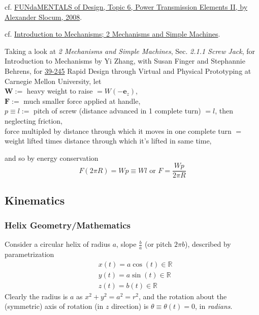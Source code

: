\documentclass[10pt]{amsart}
\begin{document}
\begin{multicols*}{2}
cf. \href{http://web.mit.edu/2.75/fundamentals/FUNdaMENTALs\%20Book\%20pdf/FUNdaMENTALs\%20Topic\%206.PDF}{FUNdaMENTALS of Design, Topic 6, Power Transmission Elements II, by Alexander Slocum, 2008}.  


cf. \href{https://www.cs.cmu.edu/~rapidproto/mechanisms/chpt2.html}{Introduction to Mechanisms; 2 Mechanisms and Simple Machines}.  

Taking a look at \emph{2 Mechanisms and Simple Machines}, Sec. \emph{2.1.1 Screw Jack}, for Introduction to Mechanisms by Yi Zhang, with Susan Finger and Stephannie Behrens, for \href{https://www.cs.cmu.edu/~rapidproto/home.html}{39-245} Rapid Design through Virtual and Physical Prototyping at Carnegie Mellon University, let \\
$\mathbf{W} :=$ heavy weight to raise $= W(-\mathbf{e}_z)$, \\
$\mathbf{F}:=$ much smaller force applied at handle, \\
$p \equiv l :=$ pitch of screw (distance advanced in 1 complete turn) $=l$, then \\
neglecting friction, \\
force multipled by distance through which it moves in one complete turn $=$ weight lifted times distance through which it's lifted in same time, 

and so by energy conservation
\[
F(2\pi R) = Wp \equiv Wl \text{ or } F = \frac{Wp }{2\pi R}
\]

\subsection{Kinematics}

\subsubsection{Helix Geometry/Mathematics}

Consider a circular helix of radius $a$, slope $\frac{b}{a}$ (or pitch $2\pi b$), described by parametrization 
\[
\begin{aligned}
	& x(t) = a \cos{(t)} \in \mathbb{R} \\ 
		& y(t) = a \sin{(t)} \in \mathbb{R} \\ 
	& z(t) = b(t) \in \mathbb{R}
\end{aligned}
\]
Clearly the radius is $a$ as $x^2 + y^2 = a^2 = r^2$, and the rotation about the (symmetric) axis of rotation (in $z$ direction) is $\theta \equiv \theta(t) = 0$, in \emph{radians}.  


\end{multicols*}
\end{document}
